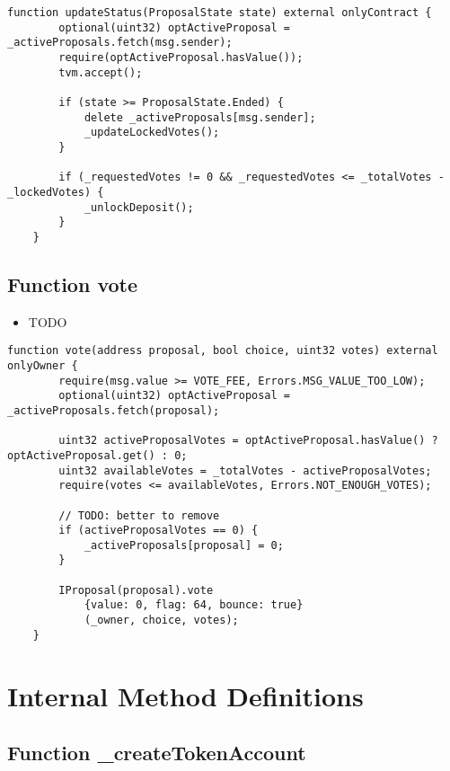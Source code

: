 \begin{lstlisting}[firstnumber=127]
    function updateStatus(ProposalState state) external onlyContract {
        optional(uint32) optActiveProposal = _activeProposals.fetch(msg.sender);
        require(optActiveProposal.hasValue());
        tvm.accept();

        if (state >= ProposalState.Ended) {
            delete _activeProposals[msg.sender];
            _updateLockedVotes();
        }

        if (_requestedVotes != 0 && _requestedVotes <= _totalVotes - _lockedVotes) {
            _unlockDeposit();
        }
    }
\end{lstlisting}

\subsection{Function vote}

\begin{itemize}
\item TODO
\end{itemize}

\begin{lstlisting}[firstnumber=55]
    function vote(address proposal, bool choice, uint32 votes) external onlyOwner {
        require(msg.value >= VOTE_FEE, Errors.MSG_VALUE_TOO_LOW);
        optional(uint32) optActiveProposal = _activeProposals.fetch(proposal);

        uint32 activeProposalVotes = optActiveProposal.hasValue() ? optActiveProposal.get() : 0;
        uint32 availableVotes = _totalVotes - activeProposalVotes;
        require(votes <= availableVotes, Errors.NOT_ENOUGH_VOTES);

        // TODO: better to remove
        if (activeProposalVotes == 0) {
            _activeProposals[proposal] = 0;
        }
        
        IProposal(proposal).vote
            {value: 0, flag: 64, bounce: true}
            (_owner, choice, votes);
    }
\end{lstlisting}

\section{Internal Method Definitions}


\subsection{Function \_{}createTokenAccount}

